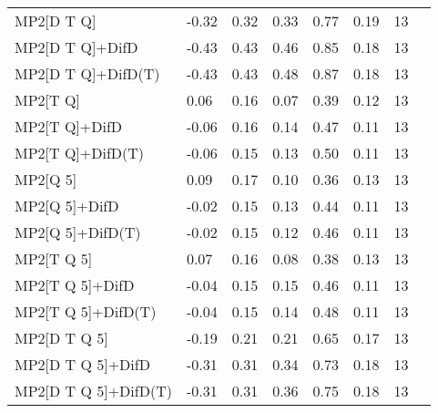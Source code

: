 \begin{table}
\begin{tabular}{l l l l l l l l }
    MP2[D T Q] & -0.32 & 0.32 & 0.33 & 0.77 & 0.19 & 13 \\ 
    MP2[D T Q]+DifD & -0.43 & 0.43 & 0.46 & 0.85 & 0.18 & 13 \\ 
    MP2[D T Q]+DifD(T) & -0.43 & 0.43 & 0.48 & 0.87 & 0.18 & 13 \\ 
    MP2[T Q] & 0.06 & 0.16 & 0.07 & 0.39 & 0.12 & 13 \\ 
    MP2[T Q]+DifD & -0.06 & 0.16 & 0.14 & 0.47 & 0.11 & 13 \\ 
    MP2[T Q]+DifD(T) & -0.06 & 0.15 & 0.13 & 0.50 & 0.11 & 13 \\ 
    MP2[Q 5] & 0.09 & 0.17 & 0.10 & 0.36 & 0.13 & 13 \\ 
    MP2[Q 5]+DifD & -0.02 & 0.15 & 0.13 & 0.44 & 0.11 & 13 \\ 
    MP2[Q 5]+DifD(T) & -0.02 & 0.15 & 0.12 & 0.46 & 0.11 & 13 \\ 
    MP2[T Q 5] & 0.07 & 0.16 & 0.08 & 0.38 & 0.13 & 13 \\ 
    MP2[T Q 5]+DifD & -0.04 & 0.15 & 0.15 & 0.46 & 0.11 & 13 \\ 
    MP2[T Q 5]+DifD(T) & -0.04 & 0.15 & 0.14 & 0.48 & 0.11 & 13 \\ 
    MP2[D T Q 5] & -0.19 & 0.21 & 0.21 & 0.65 & 0.17 & 13 \\ 
    MP2[D T Q 5]+DifD & -0.31 & 0.31 & 0.34 & 0.73 & 0.18 & 13 \\ 
    MP2[D T Q 5]+DifD(T) & -0.31 & 0.31 & 0.36 & 0.75 & 0.18 & 13 \\ 
    \bottomrule
  \end{tabular}
\end{table}
